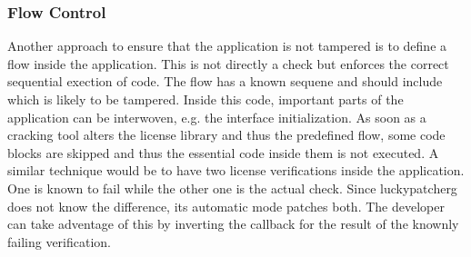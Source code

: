 \subsubsection{Flow Control} \label{subsection:counter-improve-tampering-flow}
Another approach to ensure that the application is not tampered is to define a flow inside the application.
This is not directly a check but enforces the correct sequential exection of code.
The flow has a known sequene and should include which is likely to be tampered.
Inside this code, important parts of the application can be interwoven, e.g. the interface initialization.
As soon as a cracking tool alters the license library and thus the predefined flow, some code blocks are skipped and thus the essential code inside them is not executed.
\newline
A similar technique would be to have two license verifications inside the application.
One is known to fail while the other one is the actual check.
Since \gls{luckypatcherg} does not know the difference, its automatic mode patches both.
The developer can take adventage of this by inverting the callback for the result of the knownly failing verification.
